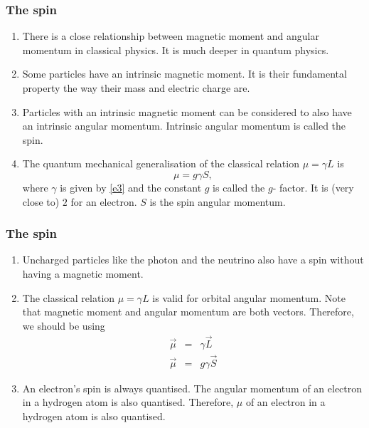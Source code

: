 \documentclass{beamer}
\begin{document}
\begin{frame}
\frametitle{The spin}
\begin{enumerate}
\item There is a close relationship between magnetic moment and angular momentum
in classical physics. It is much deeper in quantum physics.
\item Some particles have an intrinsic magnetic moment. It is their fundamental
property the way their mass and electric charge are.
\item Particles with an intrinsic magnetic moment can be considered to also have
an intrinsic angular momentum. Intrinsic angular momentum is called the spin.
\item The quantum mechanical generalisation of the classical relation $\mu = 
\gamma L$ is
\begin{equation}\label{e7}
\mu = g\gamma S,
\end{equation}
where $\gamma$ is given by \eqref{e3} and the constant $g$ is called the $g$-
factor. It is (very close to) $2$ for an electron. $S$ is the spin angular 
momentum.
\end{enumerate}
\end{frame}

\begin{frame}
\frametitle{The spin}
\begin{enumerate}
\item Uncharged particles like the photon and the neutrino also have a spin 
without having a magnetic moment.
\item The classical relation $\mu = \gamma L$ is valid for orbital angular 
momentum. Note that magnetic moment and angular momentum are both vectors.
Therefore, we should be using
\begin{eqnarray}
\vec{\mu} &=& \gamma\vec{L} \label{e8} \\
\vec{\mu} &=& g\gamma\vec{S} \label{e9}
\end{eqnarray}
\item An electron's spin is always quantised. The angular momentum of an 
electron in a hydrogen atom is also quantised. Therefore, $\mu$ of an electron
in a hydrogen atom is also quantised.
\end{enumerate}
\end{frame}
\end{document}
